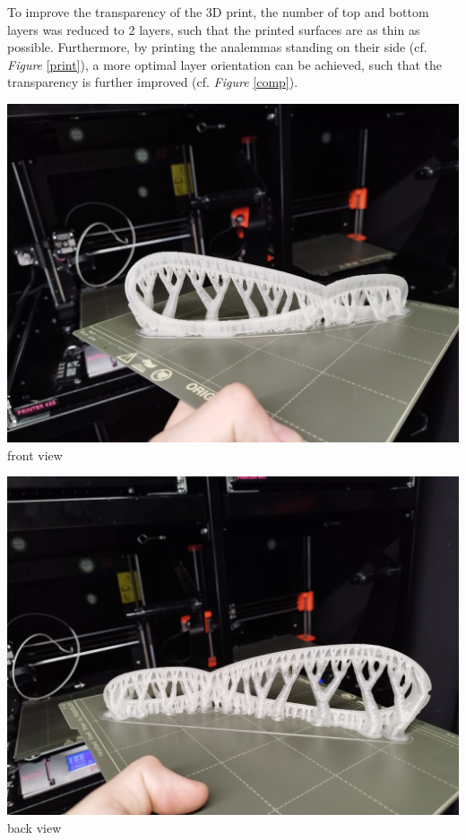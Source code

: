 \documentclass[a4paper,9pt]{article}
\begin{document}
    \begin{multicols}{2}
    To improve the transparency of the 3D print, the number of top and bottom layers was reduced to 2 layers, such that the printed surfaces are as thin as possible. Furthermore, by printing the analemmas standing on their side  (cf. \textit{Figure} \ref{print}), a more optimal layer orientation can be achieved, such that the transparency is further improved (cf. \textit{Figure} \ref{comp}).
    \end{multicols}
    \begin{minipage}{0.48\linewidth}
        \centering
        \includegraphics[width=.85\linewidth]{Images/p1.jpg}
        \\{front view}
    \end{minipage}
    \hfill
    \begin{minipage}{0.48\linewidth}
         \centering
        \includegraphics[width=.85\linewidth]{Images/p2.jpg}
     \\{back view}
        
    \end{minipage}
\end{document}
